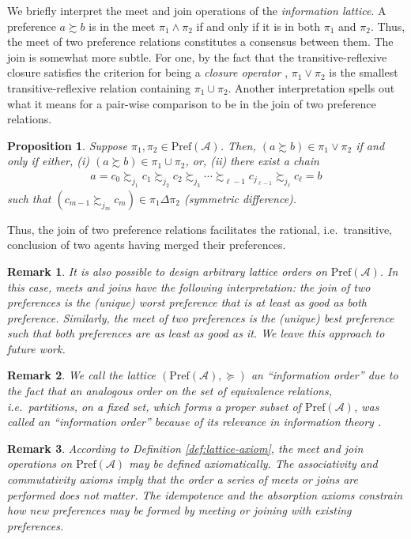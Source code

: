 \documentclass[conference]{ieeeconf}
\newcommand{\A}{\mathcal{A}}
\newcommand{\Pref}{\mathrm{Pref}}
\newcommand{\prefers}{\succsim}
\newcommand{\join}{\vee}
\newcommand{\meet}{\wedge}
\newtheorem{proposition}{Proposition}
\newtheorem{remark}{Remark}
\begin{document}
We briefly interpret the meet and join operations of the \emph{information lattice}. A preference $a \prefers b$ is in the meet $\pi_1 \meet \pi_2$ if and only if it is in both $\pi_1$ and $\pi_2$. Thus, the meet of two preference relations constitutes a consensus between them. The join is somewhat more subtle. For one, by the fact that the transitive-reflexive closure satisfies the criterion for being a \emph{closure operator} \cite{roman}, $\pi_1 \join \pi_2$ is the smallest transitive-reflexive relation containing $\pi_1 \cup \pi_2$. Another interpretation spells out what it means for a pair-wise comparison to be in the join of two preference relations.
\begin{proposition}
    Suppose $\pi_1, \pi_2 \in \Pref(\A)$. Then, $(a \prefers b) \in \pi_1 \join \pi_2$ if and only if either, (i) $(a \prefers b) \in \pi_1 \cup \pi_2$, or, (ii) there exist a chain
    \begin{align}
        a = c_0 \prefers_{j_1} c_1 \prefers_{j_2} c_2 \prefers_{j_3} \cdots \prefers_{\ell-1} c_{j_{\ell-1}} \prefers_{j_\ell} c_{\ell} = b \label{eq:chain}
    \end{align}
    such that $\left( c_{m-1} \prefers_{{j_m}} c_{m} \right) \in \pi_1 \Delta \pi_2$ (symmetric difference).
\end{proposition}

Thus, the join of two preference relations facilitates the rational, i.e.~transitive, conclusion of two agents having merged their preferences.

\begin{remark}
    It is also possible to design arbitrary lattice orders on $\Pref(\A)$. In this case, meets and joins have the following interpretation: the join of two preferences is the (unique) worst preference that is at least as good as both preference. Similarly, the meet of two preferences is the (unique) best preference such that both preferences are as least as good as it. We leave this approach to future work.
\end{remark}
\begin{remark}
    We call the lattice $(\Pref(\A), \succeq)$ an ``information order'' due to the fact that an analogous order on the set of equivalence relations, i.e.~partitions, on a fixed set, which forms a proper subset of $\Pref(\A)$, was called an ``information order'' because of its relevance in information theory \cite{shannon}.
\end{remark}
\begin{remark}
    According to Definition \ref{def:lattice-axiom}, the meet and join operations on $\Pref(\A)$ may be defined axiomatically. The associativity and commutativity axioms imply that the order a series of meets or joins are performed does not matter. The idempotence and the absorption axioms constrain how new preferences may be formed by meeting or joining with existing preferences.
\end{remark}
\end{document}
